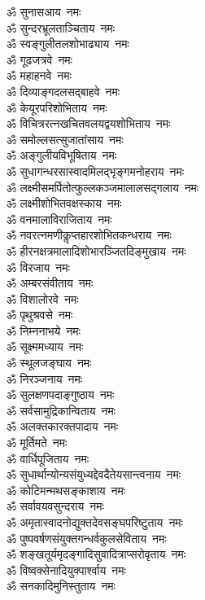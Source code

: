 \begin{multicols}{2}
\begin{flushleft}
ॐ सुनासआय~नमः\\
ॐ सुन्दरभ्रूलताञ्चिताय~नमः\\
ॐ स्वङ्गुलीतलशोभाढ्याय~नमः\\
ॐ गूढजत्रवे~नमः\hfill{}\\
ॐ महाहनवे~नमः\\
ॐ दिव्याङ्गदलसद्बाहवे~नमः\\
ॐ केयूरपरिशोभिताय~नमः\\
ॐ विचित्ररत्नखचितवलयद्वय\-शोभिताय~नमः\\
ॐ समोल्लसत्सुजातांसाय~नमः\\
ॐ अङ्गुलीयविभूषिताय~नमः\\
ॐ सुधागन्धरसास्वादमिलद्भृङ्ग\-मनोहराय~नमः\\
ॐ लक्ष्मीसमर्पितोत्फुल्ल\-कञ्जमालालसद्गलाय~नमः\\
ॐ लक्ष्मीशोभितवक्षस्काय~नमः\\
ॐ वनमालाविराजिताय~नमः\hfill{}\\
ॐ नवरत्नमणीकॢप्तहारशोभित\-कन्धराय~नमः\\
ॐ हीरनक्षत्रमालादिशोभारञ्जित\-दिङ्मुखाय~नमः\\
ॐ विरजाय~नमः\\
ॐ अम्बरसंवीताय~नमः\\
ॐ विशालोरवे~नमः\\
ॐ पृथुश्रवसे~नमः\\
ॐ निम्ननाभये~नमः\\
ॐ सूक्ष्ममध्याय~नमः\\
ॐ स्थूलजङ्घाय~नमः\\
ॐ निरञ्जनाय~नमः\hfill{}\\
ॐ सुलक्षणपदाङ्गुष्ठाय~नमः\\
ॐ सर्वसामुद्रिकान्विताय~नमः\\
ॐ अलक्तकारक्तपादाय~नमः\\
ॐ मूर्तिमते~नमः\\
ॐ वार्धिपूजिताय~नमः\\
ॐ सुधार्थान्योन्यसंयुध्यद्देवदैतेय\-सान्त्वनाय~नमः\\
ॐ कोटिमन्मथसङ्काशाय~नमः\\
ॐ सर्वावयवसुन्दराय~नमः\\
ॐ अमृतास्वादनोद्युक्तदेवसङ्घ\-परिष्टुताय~नमः\\
ॐ पुष्पवर्षणसंयुक्तगन्धर्वकुल\-सेविताय~नमः\hfill{}\\
ॐ शङ्खतूर्यमृदङ्गादि\-सुवादित्राप्सरोवृताय~नमः\\
ॐ विष्वक्सेनादियुक्पार्श्वाय~नमः\\
ॐ सनकादिमुनिस्तुताय~नमः\\

\end{flushleft}
\end{multicols}
